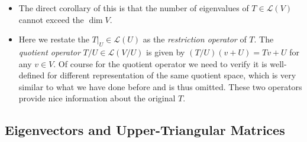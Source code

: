 \documentclass{article}
\renewcommand{\d}{\dim}
\newcommand{\LV}{\mathcal{L}(V)}
\begin{document}
\begin{itemize}
    \item The direct corollary of this is that the number of eigenvalues of $T \in \LV$ cannot exceed the $\d V$.
    \item Here we restate the $T|_U \in \mathcal{L}(U)$ as the \textit{restriction operator} of $T$. The \textit{quotient operator} $T/U \in \mathcal{L}(V/U)$ is given by $(T/U)(v+U) = Tv+U$ for any $v \in V$. Of course for the quotient operator we need to verify it is well-defined for different representation of the same quotient space, which is very similar to what we have done before and is thus omitted. These two operators provide nice information about the original $T$.
\end{itemize}

\subsection{Eigenvectors and Upper-Triangular
Matrices}
\end{document}

